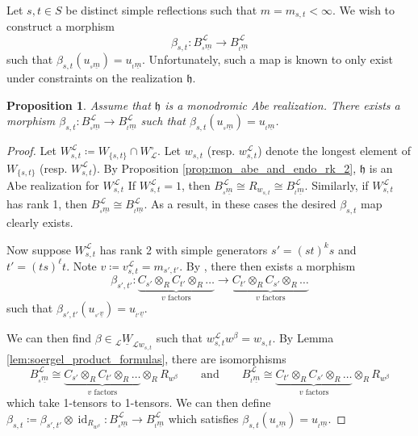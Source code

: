 \documentclass{amsart}
\newcommand{\scrL}{\mathcal{L}}
\DeclareMathOperator{\id}{id}
\newcommand{\fr}[1]{\mathfrak{#1}}
\newcommand{\uW}[2]{{}_{#1}\underline{W}_{#2}}
\newtheorem{proposition}[subsubsection]{Proposition}
\theoremstyle{definition}
\numberwithin{equation}{subsection}
\begin{document}
Let $s,t \in S$ be distinct simple reflections such that $m = m_{s,t} < \infty$. We wish to construct a morphism
\[\beta_{s,t} : B_{{}_s \underline{m}}^{\scrL} \to B_{{}_t \underline{m}}^{\scrL}\]
such that $\beta_{s,t} (u_{{}_s \underline{m}}) = u_{{}_t \underline{m}}$.
Unfortunately, such a map is known to only exist under constraints on the realization $\fr{h}$.

\begin{proposition}\label{prop:existence_of_rex_moves}
    Assume that $\fr{h}$ is a monodromic Abe realization. There exists a morphism $\beta_{s,t} : B_{{}_s\underline{m}}^{\scrL} \to B_{{}_t\underline{m}}^{\scrL}$ such that $\beta_{s,t} (u_{{}_s \underline{m}}) = u_{{}_t \underline{m}}$.
\end{proposition}
\begin{proof}
    Let $W_{s,t}^{\scrL} \coloneq W_{\{s,t\}} \cap W_{\scrL}^{\circ}$. Let $w_{s,t}$ (resp. $w_{s,t}^{\scrL}$) denote the longest element of $W_{\{s,t\}}$ (resp. $W_{s,t}^{\scrL}$).
    By Proposition \ref{prop:mon_abe_and_endo_rk_2}, $\fr{h}$ is an Abe realization for $W_{s,t}^{\scrL}$ 
    If $W_{s,t}^{\scrL} = 1$, then $B_{{}_s \underline{m}}^{\scrL} \cong R_{w_{s,t}} \cong B_{{}_t \underline{m}}^{\scrL}$.
    Similarly, if $W_{s,t}^{\scrL}$ has rank 1, then $B_{{}_s \underline{m}}^{\scrL} \cong B_{{}_t \underline{m}}^{\scrL}$. As a result, in these cases the desired $\beta_{s,t}$ map clearly exists.

    Now suppose $W_{s,t}^{\scrL}$ has rank 2 with simple generators $s' = (st)^k s$ and $t' = (ts)^{\ell} t$.
    Note $v \coloneq v_{s,t}^{\scrL} = m_{s',t'}$. By \cite[Theorem 3.9]{Abe21}, there then exists a morphism 
    \[ \beta_{s',t'} : \underbrace{C_{s'} \otimes_R C_{t'} \otimes_R \ldots }_{v \text{ factors}} \longrightarrow \underbrace{C_{t'} \otimes_R C_{s'} \otimes_R \ldots }_{v \text{ factors}} \]
    such that $\beta_{s',t'} (u_{{}_{s'} \underline{v}}) = u_{{}_{t'} \underline{v}}$. 
    
    We can then find $\beta \in \uW{\scrL}{\scrL w_{s,t}}$ such that $w_{s,t}^{\scrL} w^{\beta} = w_{s,t}$. By Lemma \ref{lem:soergel_product_formulas}, there are isomorphisms
    \[ B_{{}_s\underline{m}}^{\scrL} \cong \underbrace{C_{s'} \otimes_R C_{t'} \otimes_R \ldots }_{v \text{ factors}} \otimes_R R_{w^{\beta}} \qquad \text{and}\qquad B_{{}_t \underline{m}}^{\scrL} \cong \underbrace{C_{t'} \otimes_R C_{s'} \otimes_R \ldots }_{v \text{ factors}} \otimes_R R_{w^{\beta}}\]
    which take 1-tensors to 1-tensors.
    We can then define $\beta_{s,t} \coloneq \beta_{s',t'} \otimes \id_{R_{w^{\beta}}} : B_{{}_s \underline{m}}^{\scrL} \to B_{{}_t \underline{m}}^{\scrL}$ which satisfies $\beta_{s,t} (u_{{}_s \underline{m}}) = u_{{}_t \underline{m}}$.
\end{proof}
\end{document}
